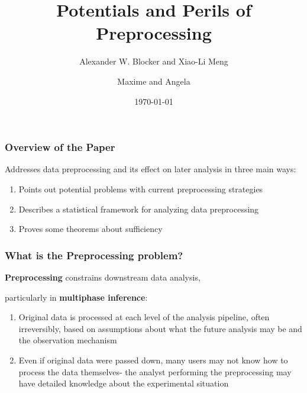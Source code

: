 \documentclass[10pt, compress]{beamer}
\title{Potentials and Perils of Preprocessing}
\subtitle{Alexander W. Blocker and Xiao-Li Meng}
\date{\today}
\author{Maxime and Angela}
\begin{document}
\maketitle

\begin{frame}[fragile]
    \frametitle{Overview of the Paper}
    
    Addresses data preprocessing and its effect on later analysis in three main ways:
    \begin{enumerate}
    \item Points out potential problems with current preprocessing strategies
    \item Describes a statistical framework for analyzing data preprocessing
    \item Proves some theorems about sufficiency 
    \end{enumerate}

\end{frame}

\begin{frame}[fragile]
    \frametitle{What is the Preprocessing problem?}
  
  \begin{center}
    \textbf{Preprocessing} constrains downstream data analysis, 
    
    particularly in \textbf{multiphase inference}:
  \end{center}
  
    \begin{enumerate}[<+->]
    \item Original data is processed at each level of the analysis pipeline, often irreversibly, based on assumptions about what the future analysis may be and the observation mechanism
    \vspace*{5mm}
    \item Even if original data were passed down, many users may not know how to process the data themselves- the analyst performing the preprocessing may have detailed knowledge about the experimental situation
  \end{enumerate}
  
\end{frame}
\end{document}
